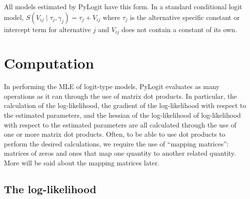 \documentclass{article}
\begin{document}
All models estimated by PyLogit have this form. In a standard conditional logit model, $S \left( V_{ij} \mid \tau _j, \gamma _j \right) = \tau _j + V_{ij}$ where $\tau_j$ is the alternative specific constant or intercept term for alternative $j$ and $V_{ij} $ does not contain a constant of its own.

\section{Computation}
In performing the MLE of logit-type models, PyLogit evaluates as many operations as it can through the use of matrix dot products. In particular, the calculation of the log-likelihood, the gradient of the log-likelihood with respect to the estimated parameters, and the hessian of the log-likelihood of log-likelihood with respect to the estimated parameters are all calculated through the use of one or more matrix dot products. Often, to be able to use dot products to perform the desired calculations, we require the use of ``mapping matrices'': matrices of zeros and ones that map one quantity to another related quantity. More will be said about the mapping matrices later.

\subsection{The log-likelihood}
\end{document}
